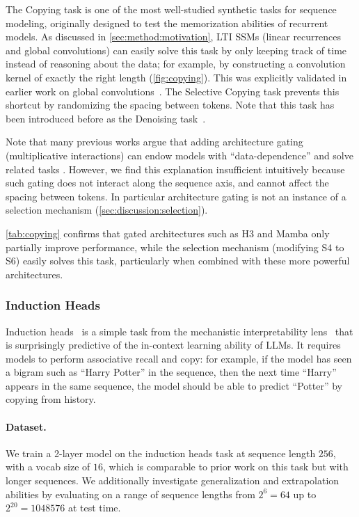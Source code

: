 The Copying task is one of the most well-studied synthetic tasks for sequence modeling, originally designed to test the memorization abilities of recurrent models. As discussed in \ref{sec:method:motivation}, LTI SSMs (linear recurrences and global convolutions) can easily solve this task by only keeping track of time instead of reasoning about the data; for example, by constructing a convolution kernel of exactly the right length (\ref{fig:copying}).
This was explicitly validated in earlier work on global convolutions~\citep{romero2021ckconv}.
The Selective Copying task prevents this shortcut by randomizing the spacing between tokens. Note that this task has been introduced before as the Denoising task~\citep{jing2019gated}.

Note that many previous works argue that adding architecture gating (multiplicative interactions) can endow models with ``data-dependence'' and solve related tasks \citep{dao2023hungry,poli2023hyena}.
However, we find this explanation insufficient intuitively because such gating does not interact along the sequence axis, and cannot affect the spacing between tokens. In particular architecture gating is not an instance of a selection mechanism (\ref{sec:discussion:selection}).

\ref{tab:copying} confirms that gated architectures such as H3 and Mamba only partially improve performance, while the selection mechanism (modifying S4 to S6) easily solves this task, particularly when combined with these more powerful architectures.

\subsubsection{Induction Heads}

Induction heads~\citep{olsson2022context} is a simple task from the mechanistic interpretability lens~\citep{elhage2021mathematical} that is surprisingly predictive of the in-context learning ability of LLMs. It requires models to perform associative recall and copy: for example, if the model has seen a bigram such as ``Harry Potter'' in the sequence, then the next time ``Harry'' appears in the same sequence, the model should be able to predict ``Potter'' by copying from history.

\paragraph{Dataset.}
We train a 2-layer model on the induction heads task at sequence length $256$, with a vocab size of $16$, which is comparable to prior work on this task \citep{dao2023hungry} but with longer sequences. We additionally investigate generalization and extrapolation abilities by evaluating on a range of sequence lengths from $2^6 = 64$ up to $2^{20} = 1048576$ at test time.

